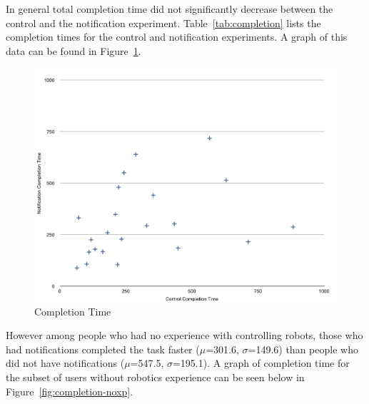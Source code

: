 In general total completion time did not significantly decrease between the control and the notification experiment. Table~\ref{tab:completion} lists the completion times for the control and notification experiments. A graph of this data can be found in Figure~\ref{fig:completion}.


\begin{figure}[ht]
\begin{center}
\includegraphics[width=5in]{images/results-completion-graph.png}
\caption{Completion Time\label{fig:completion}}
\end{center}
\end{figure}

However among people who had no experience with controlling robots, those who had notifications completed the task faster ($\mu$=301.6, $\sigma$=149.6) than people who did not have notifications ($\mu$=547.5, $\sigma$=195.1). A graph of completion time for the subset of users without robotics experience can be seen below in Figure~\ref{fig:completion-noxp}.

